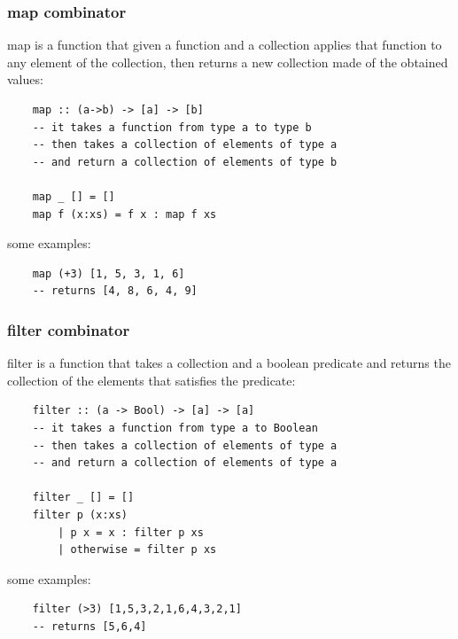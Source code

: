 \subsubsection{map combinator}
map is a function that given a function and a collection applies that function to any element of the collection, then returns a new collection made of the obtained values:
\begin{verbatim}
    map :: (a->b) -> [a] -> [b]
    -- it takes a function from type a to type b
    -- then takes a collection of elements of type a
    -- and return a collection of elements of type b

    map _ [] = []
    map f (x:xs) = f x : map f xs
\end{verbatim}
some examples:
\begin{verbatim}
    map (+3) [1, 5, 3, 1, 6]
    -- returns [4, 8, 6, 4, 9]
\end{verbatim}

\subsubsection{filter combinator}
filter is a function that takes a collection and a boolean predicate and returns the collection of the elements that satisfies the predicate:
\begin{verbatim}
    filter :: (a -> Bool) -> [a] -> [a]
    -- it takes a function from type a to Boolean
    -- then takes a collection of elements of type a
    -- and return a collection of elements of type a

    filter _ [] = []
    filter p (x:xs)
        | p x = x : filter p xs
        | otherwise = filter p xs
\end{verbatim}
some examples:
\begin{verbatim}
    filter (>3) [1,5,3,2,1,6,4,3,2,1]
    -- returns [5,6,4]
\end{verbatim}


